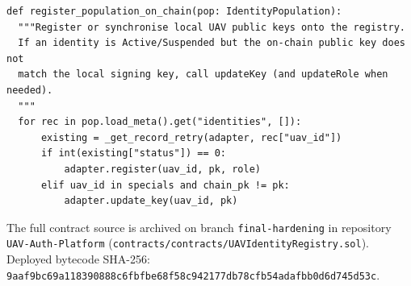 \begin{lstlisting}[style=python,caption={On-chain population synchronisation (\texttt{runner.py}, excerpt)},label=lst:runner-sync]
def register_population_on_chain(pop: IdentityPopulation):
  """Register or synchronise local UAV public keys onto the registry.
  If an identity is Active/Suspended but the on-chain public key does not
  match the local signing key, call updateKey (and updateRole when needed).
  """
  for rec in pop.load_meta().get("identities", []):
      existing = _get_record_retry(adapter, rec["uav_id"])
      if int(existing["status"]) == 0:
          adapter.register(uav_id, pk, role)
      elif uav_id in specials and chain_pk != pk:
          adapter.update_key(uav_id, pk)
\end{lstlisting}

The full contract source is archived on branch \texttt{final-hardening} in repository \texttt{UAV-Auth-Platform} (\texttt{contracts/contracts/UAVIdentityRegistry.sol}). Deployed bytecode SHA-256: \texttt{9aaf9bc69a118390888c6fbfbe68f58c942177db78cfb54adafbb0d6d745d53c}.
